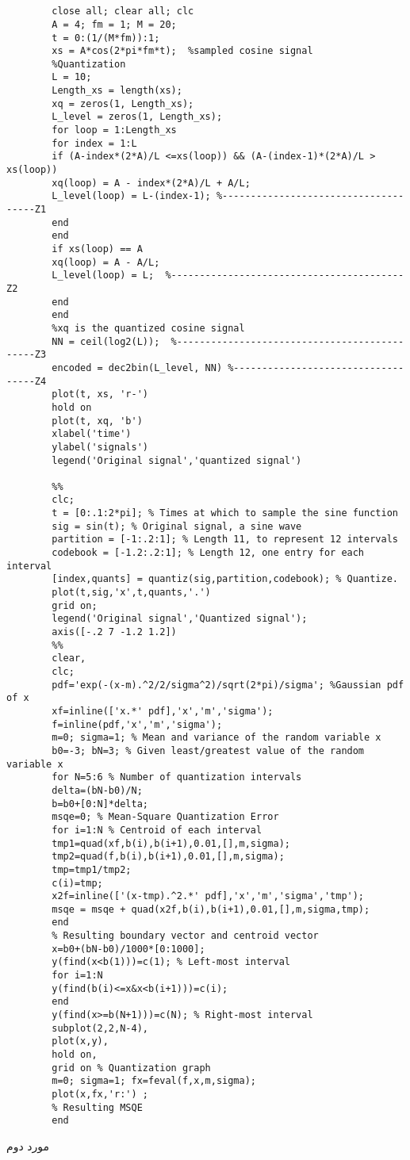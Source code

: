 \documentclass{book}
\author{علی}
\begin{document}
	\maketitle
	\tableofcontents
	\singlespacing
	\listoffigures
	\listoftables
	\Time
\chapter{}
\begin{latin}
	\begin{verbatim}
		close all; clear all; clc
		A = 4; fm = 1; M = 20;
		t = 0:(1/(M*fm)):1;
		xs = A*cos(2*pi*fm*t);  %sampled cosine signal
		%Quantization
		L = 10;
		Length_xs = length(xs);
		xq = zeros(1, Length_xs);
		L_level = zeros(1, Length_xs);
		for loop = 1:Length_xs
		for index = 1:L
		if (A-index*(2*A)/L <=xs(loop)) && (A-(index-1)*(2*A)/L > xs(loop)) 
		xq(loop) = A - index*(2*A)/L + A/L;
		L_level(loop) = L-(index-1); %-------------------------------------Z1
		end
		end
		if xs(loop) == A
		xq(loop) = A - A/L;
		L_level(loop) = L;  %-----------------------------------------Z2
		end
		end
		%xq is the quantized cosine signal
		NN = ceil(log2(L));  %---------------------------------------------Z3
		encoded = dec2bin(L_level, NN) %-----------------------------------Z4
		plot(t, xs, 'r-')
		hold on
		plot(t, xq, 'b')
		xlabel('time')
		ylabel('signals')
		legend('Original signal','quantized signal')
		
		%% 
		clc;
		t = [0:.1:2*pi]; % Times at which to sample the sine function
		sig = sin(t); % Original signal, a sine wave
		partition = [-1:.2:1]; % Length 11, to represent 12 intervals
		codebook = [-1.2:.2:1]; % Length 12, one entry for each interval
		[index,quants] = quantiz(sig,partition,codebook); % Quantize.
		plot(t,sig,'x',t,quants,'.')
		grid on;
		legend('Original signal','Quantized signal');
		axis([-.2 7 -1.2 1.2])
		%%
		clear,
		clc;
		pdf='exp(-(x-m).^2/2/sigma^2)/sqrt(2*pi)/sigma'; %Gaussian pdf of x
		xf=inline(['x.*' pdf],'x','m','sigma');
		f=inline(pdf,'x','m','sigma');
		m=0; sigma=1; % Mean and variance of the random variable x
		b0=-3; bN=3; % Given least/greatest value of the random variable x
		for N=5:6 % Number of quantization intervals
		delta=(bN-b0)/N; 
		b=b0+[0:N]*delta;
		msqe=0; % Mean-Square Quantization Error
		for i=1:N % Centroid of each interval
		tmp1=quad(xf,b(i),b(i+1),0.01,[],m,sigma);
		tmp2=quad(f,b(i),b(i+1),0.01,[],m,sigma);
		tmp=tmp1/tmp2;
		c(i)=tmp; 
		x2f=inline(['(x-tmp).^2.*' pdf],'x','m','sigma','tmp');
		msqe = msqe + quad(x2f,b(i),b(i+1),0.01,[],m,sigma,tmp); 
		end
		% Resulting boundary vector and centroid vector
		x=b0+(bN-b0)/1000*[0:1000];
		y(find(x<b(1)))=c(1); % Left-most interval
		for i=1:N
		y(find(b(i)<=x&x<b(i+1)))=c(i);
		end
		y(find(x>=b(N+1)))=c(N); % Right-most interval
		subplot(2,2,N-4), 
		plot(x,y),
		hold on,
		grid on % Quantization graph
		m=0; sigma=1; fx=feval(f,x,m,sigma);
		plot(x,fx,'r:') ;
		% Resulting MSQE
		end
	\end{verbatim}
\end{latin}
\BNaz
مورد دوم 
\end{document}
